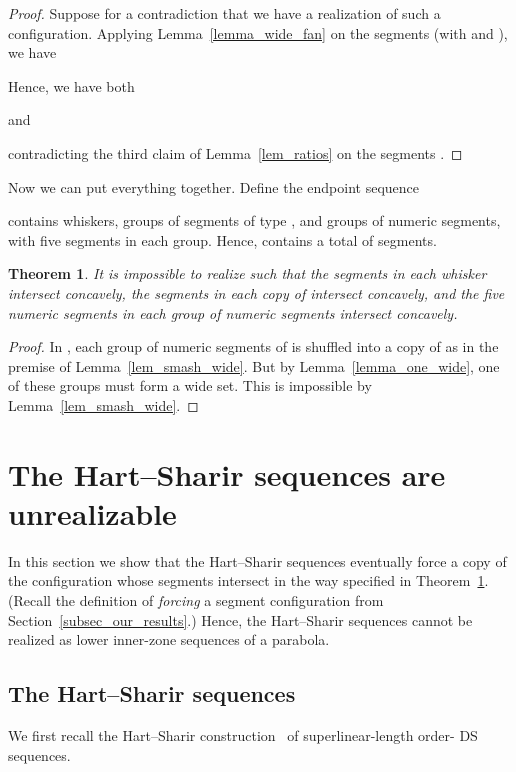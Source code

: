\documentclass[11pt]{article}
\newtheorem{theorem}{Theorem}[section]
\theoremstyle{definition}
\theoremstyle{remark}
\begin{document}
\begin{proof}
Suppose for a contradiction that we have a realization of such a configuration. Applying Lemma~\ref{lemma_wide_fan} on the segments  (with  and ), we have

Hence, we have both

and

contradicting the third claim of Lemma~\ref{lem_ratios} on the segments .
\end{proof}

Now we can put everything together. Define the endpoint sequence

 contains  whiskers,  groups of segments of type , and  groups of numeric segments, with five segments in each group. Hence,  contains a total of  segments.

\begin{theorem}\label{thm_forbidden_2}
It is impossible to realize  such that the segments  in each whisker intersect concavely,  the segments  in each copy of  intersect concavely, and the five numeric segments in each group of numeric segments intersect concavely.
\end{theorem}

\begin{proof}
In , each group of numeric segments of  is shuffled into a copy of  as in the premise of Lemma~\ref{lem_smash_wide}. But by Lemma~\ref{lemma_one_wide}, one of these groups must form a wide set. This is impossible by Lemma~\ref{lem_smash_wide}.
\end{proof}

\section{The Hart--Sharir sequences are unrealizable}\label{sec_ababa}

In this section we show that the Hart--Sharir sequences eventually force a copy of the configuration  whose segments intersect in the way specified in Theorem~\ref{thm_forbidden_2}. (Recall the definition of \emph{forcing} a segment configuration from Section~\ref{subsec_our_results}.) Hence, the Hart--Sharir sequences cannot be realized as lower inner-zone sequences of a parabola.

\subsection{The Hart--Sharir sequences}

We first recall the Hart--Sharir construction~\cite{HS} of superlinear-length order- DS sequences.
\end{document}
